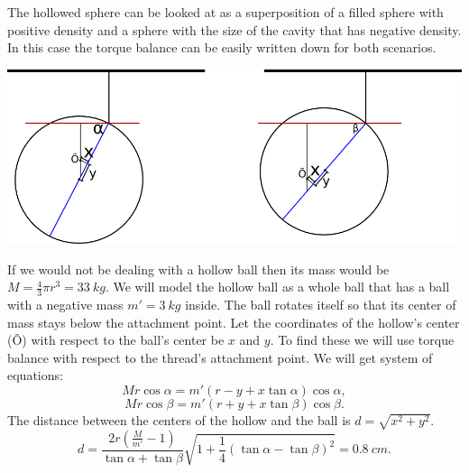 {\ifEngHint
The hollowed sphere can be looked at as a superposition of a filled sphere with positive density and a sphere with the size of the cavity that has negative density. In this case the torque balance can be easily written down for both scenarios.
\fi


\ifEngSolution
\begin{center}
\includegraphics[width=\textwidth]{2013-v2g-09-kera}
\end{center}
If we would not be dealing with a hollow ball then its mass would be $M=\frac{4}{3}\pi r^3 = \SI{33}{kg}$. We will model the hollow ball as a whole ball that has a ball with a negative mass $m'=\SI{3}{kg}$ inside. The ball rotates itself so that its center of mass stays below the attachment point. Let the coordinates of the hollow’s center (Õ) with respect to the ball’s center be $x$ and $y$. To find these we will use torque balance with respect to the thread’s attachment point. We will get system of equations:
\[Mr \cos \alpha = m'(r-y+x \tan \alpha) \cos \alpha,\] 
\[Mr \cos \beta = m'(r+y+x \tan \beta) \cos \beta.\]
The distance between the centers of the hollow and the ball is $d=\sqrt{x^2+y^2}$.
\[ d=\frac{2r(\frac{M}{m'}-1)}{\tan\alpha+\tan\beta}\sqrt{1+\frac{1}{4}(\tan\alpha-\tan\beta)^2} = \SI{0,8}{cm}. \]
\fi
}